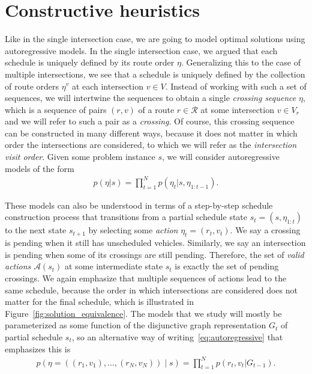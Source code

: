 \documentclass[a4paper]{article}
\theoremstyle{definition}
\theoremstyle{plain}
\begin{document}
\newpage
\section{Constructive heuristics}

Like in the single intersection case, we are going to model optimal solutions
using autoregressive models.
%
In the single intersection case, we argued that each schedule is uniquely
defined by its route order $\eta$. Generalizing this to the case of multiple
intersections, we see that a schedule is uniquely defined by the collection of
route orders $\eta^{v}$ at each intersection $v \in V$. Instead of working with
such a set of sequences, we will intertwine the sequences to obtain a single
\textit{crossing sequence} $\eta$, which is a sequence of pairs $(r, v)$ of a
route $r \in \mathcal{R}$ at some intersection $v \in V_{r}$ and we will refer
to such a pair as a \textit{crossing}. Of course, this crossing sequence can be
constructed in many different ways, because it does not matter in which order
the intersections are considered, to which we will refer as the
\textit{intersection visit order}.
Given some problem instance $s$, we will consider autoregressive models of the form
\begin{align}
  \label{eq:autoregressive}
  p(\eta | s) =  \prod_{t=1}^{N} p(\eta_{t}| s, \eta_{1:t-1}) .
\end{align}

These models can also be understood in terms of a step-by-step schedule
construction process that transitions from a partial schedule state
$s_{t} = (s, \eta_{1:t})$ to the next state $s_{t+1}$ by selecting some
\textit{action} $\eta_{t} = (r_{t}, v_{t})$. We say a crossing is pending when
it still has unscheduled vehicles. Similarly, we say an intersection is pending
when some of its crossings are still pending. Therefore, the set of \textit{valid actions}
$\mathcal{A}(s_{t})$ at some intermediate state $s_{t}$ is exactly the set of
pending crossings.
%
We again emphasize that multiple sequences of actions lead to the same schedule,
because the order in which intersections are considered does not matter for the
final schedule, which is illustrated in Figure~\ref{fig:solution_equivalence}.
%
The models that we study will mostly be parameterized as some function of the
disjunctive graph representation $G_{t}$ of partial schedule $s_{t}$, so an
alternative way of writing~\eqref{eq:autoregressive} that emphasizes this is
\begin{align*}
  p(\eta = ((r_{1}, v_{1}), \dots, (r_{N}, v_{N})) \; | \; s) = \prod_{t=1}^{N} p(r_{t}, v_{t} | G_{t-1}) .
\end{align*}
\end{document}
